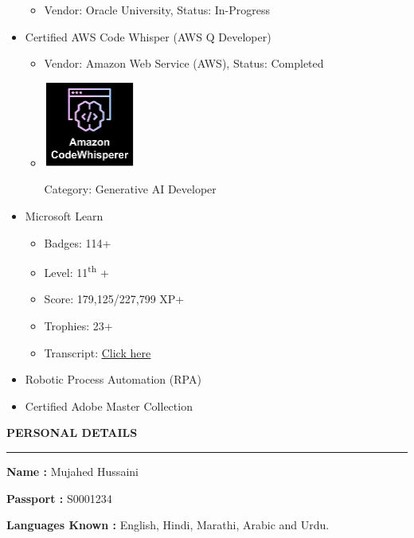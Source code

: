 \documentclass[a4paper]{article}
\begin{document}
\begin{itemize}
    \begin{itemize}
    \item Vendor: Oracle University, Status: In-Progress
    \end{itemize}
  
  \item
    Certified AWS Code Whisper (AWS Q Developer)
  
    \begin{itemize}
    \item Vendor: Amazon Web Service (AWS), Status: Completed
    \item
      \hspace{0.5cm}  %
      \begin{minipage}[t]{0.1\textwidth}
        \includegraphics[width=\linewidth]{media/image25.png}
      \end{minipage}
      Category: Generative AI Developer
    \end{itemize}
  
  \item
    Microsoft Learn
  
    \begin{itemize}
    \item Badges: 114+
    \item Level: 11\textsuperscript{th} +
    \item Score: 179,125/227,799 XP+
    \item Trophies: 23+
    \item Transcript: \href{https://learn.microsoft.com/en-gb/users/mujahedh/transcript/d8k4jb84x69nm62}{\ul{Click here}}
    \end{itemize}
  
  \item
    Robotic Process Automation (RPA)
  \item
    Certified Adobe Master Collection
\end{itemize}

\begin{center}
  \textbf{PERSONAL DETAILS}
  \rule{\textwidth}{0.4pt}  %
\end{center}

\textbf{Name :} Mujahed Hussaini

\textbf{Passport :} S0001234

\textbf{Languages Known :} English, Hindi, Marathi, Arabic and Urdu.
\end{document}
